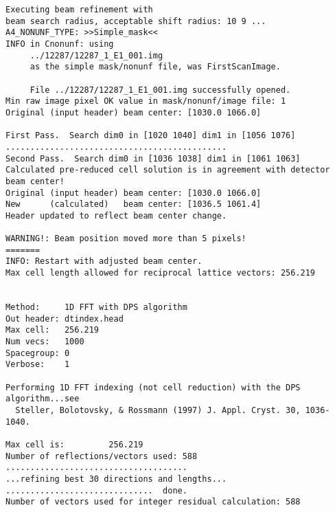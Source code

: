 \documentclass[a4paper, 11pt]{article}
\begin{document}
{\begin{verbatim}
Executing beam refinement with
beam search radius, acceptable shift radius: 10 9 ...
A4_NONUNF_TYPE: >>Simple_mask<<
INFO in Cnonunf: using
     ../12287/12287_1_E1_001.img
     as the simple mask/nonunf file, was FirstScanImage.

     File ../12287/12287_1_E1_001.img successfully opened.
Min raw image pixel OK value in mask/nonunf/image file: 1
Original (input header) beam center: [1030.0 1066.0]

First Pass.  Search dim0 in [1020 1040] dim1 in [1056 1076]
.............................................
Second Pass.  Search dim0 in [1036 1038] dim1 in [1061 1063]
Calculated pre-reduced cell solution is in agreement with detector beam center!
Original (input header) beam center: [1030.0 1066.0]
New      (calculated)   beam center: [1036.5 1061.4]
Header updated to reflect beam center change.

WARNING!: Beam position moved more than 5 pixels!
=======
INFO: Restart with adjusted beam center.
Max cell length allowed for reciprocal lattice vectors: 256.219


Method:     1D FFT with DPS algorithm
Out header: dtindex.head
Max cell:   256.219
Num vecs:   1000
Spacegroup: 0
Verbose:    1

Performing 1D FFT indexing (not cell reduction) with the DPS algorithm...see
  Steller, Bolotovsky, & Rossmann (1997) J. Appl. Cryst. 30, 1036-1040.

Max cell is:         256.219
Number of reflections/vectors used: 588
.....................................
...refining best 30 directions and lengths...
..............................  done.
Number of vectors used for integer residual calculation: 588


\end{verbatim}}
\end{document}

